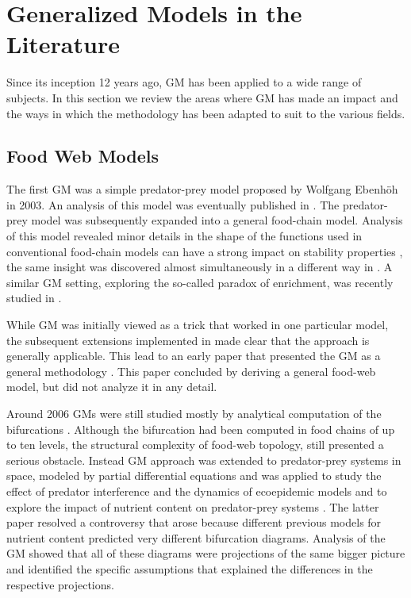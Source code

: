 \documentclass{article}
\begin{document}

\section{Generalized Models in the Literature}
Since its inception 12 years ago, GM has been applied to a wide range of subjects. In this section we review the areas where GM has made an impact and the ways in which the methodology has been adapted to suit to the various fields.

\subsection{Food Web Models}
The first GM was a simple predator-prey model proposed by Wolfgang Ebenh\"oh in 2003. An analysis of this model was eventually published in \cite{Gross2004PD}. The predator-prey model was subsequently expanded into a general food-chain model. Analysis of this model revealed minor details in the shape of the functions used in conventional food-chain models can have a strong impact on stability properties \citep{Gross2004JTB}, the same insight was discovered almost simultaneously in a different way in \cite{fussmann2005community}. A similar GM setting, exploring the so-called paradox of enrichment, was recently studied in \cite{awender2021stability}.

While GM was initially viewed as a trick that worked in one particular model, the subsequent extensions implemented in \cite{Gross2005OIKOS} made clear that the approach is generally applicable. This lead to an early paper that presented the GM as a general methodology \citep{Gross2006PRE}. This paper concluded by deriving a general food-web model, but did not analyze it in any detail.

Around 2006 GMs were still studied mostly by analytical computation of the bifurcations \citep{GrossThesis}. Although the bifurcation had been computed in food chains of up to ten levels, the structural complexity of food-web topology, still presented a serious obstacle. Instead GM approach was extended to predator-prey systems in space, modeled by partial differential equations \citep{Baurmann2007JTB} and was applied to study the effect of predator interference \citep{vanVoornMBE2008} and the dynamics of ecoepidemic models \citep{Stiefs2009MBE} and to explore the impact of nutrient content on predator-prey systems \citep{Stiefs2010AMNAT}. The latter paper resolved a controversy that arose because different previous models for nutrient content predicted very different bifurcation diagrams. Analysis of the GM showed that all of these diagrams were projections of the same bigger picture and identified the specific assumptions that explained the differences in the respective projections. 
\end{document}
